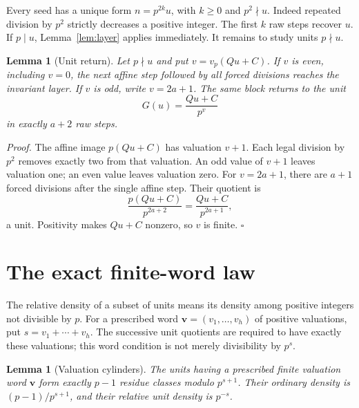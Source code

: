 \documentclass[11pt,letterpaper]{article}
\newtheorem{lemma}[theorem]{Lemma}
\newenvironment{proof}{\noindent\textit{Proof.}}{\hfill\(\square\)}
\begin{document}
Every seed has a unique form \(n=p^{2k}u\), with \(k\ge0\) and \(p^2\nmid u\).
Indeed repeated division by \(p^2\) strictly decreases a positive integer.
The first \(k\) raw steps recover \(u\). If \(p\mid u\), Lemma~\ref{lem:layer} applies immediately.
It remains to study units \(p\nmid u\).

\begin{lemma}[Unit return]
\label{lem:return}
Let \(p\nmid u\) and put \(v=v_p(Qu+C)\).
If \(v\) is even, including \(v=0\), the next affine step followed by all forced divisions reaches the invariant layer.
If \(v\) is odd, write \(v=2a+1\). The same block returns to the unit
\[
G(u)=\frac{Qu+C}{p^v}
\]
in exactly \(a+2\) raw steps.
\end{lemma}

\begin{proof}
The affine image \(p(Qu+C)\) has valuation \(v+1\).
Each legal division by \(p^2\) removes exactly two from that valuation.
An odd value of \(v+1\) leaves valuation one; an even value leaves valuation zero.
For \(v=2a+1\), there are \(a+1\) forced divisions after the single affine step.
Their quotient is
\[
\frac{p(Qu+C)}{p^{2a+2}}=\frac{Qu+C}{p^{2a+1}},
\]
a unit. Positivity makes \(Qu+C\) nonzero, so \(v\) is finite.
\end{proof}

\section{The exact finite-word law}

The relative density of a subset of units means its density among positive integers not divisible by \(p\).
For a prescribed word \(\boldsymbol v=(v_1,\ldots,v_h)\) of positive valuations, put \(s=v_1+\cdots+v_h\).
The successive unit quotients are required to have exactly these valuations; this word condition is not merely divisibility by \(p^s\).

\begin{lemma}[Valuation cylinders]
\label{lem:cylinder}
The units having a prescribed finite valuation word \(\boldsymbol v\) form exactly \(p-1\) residue classes modulo \(p^{s+1}\).
Their ordinary density is \((p-1)/p^{s+1}\), and their relative unit density is \(p^{-s}\).
\end{lemma}
\end{document}
